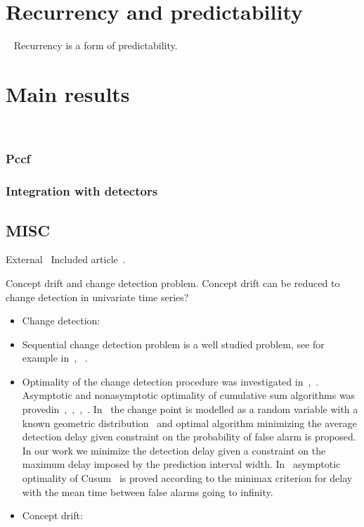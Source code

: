 \documentclass[licentiate,utf8,lot,loar,lof,shortloft,index]{jydiss}
\begin{document}
\chapter{Recurrency and predictability}
~\cite{feller2008introduction}
Recurrency is a form of predictability.


\chapter{Main results}
~\cite{MaslovSDM2016, MaslovIJCNN2017}
\subsection{Pccf}
\subsection{Integration with detectors}

\section{MISC}

External~\cite{shewhart1931economic}
Included article~\cite{sha1}.

Concept drift and change detection problem.
Concept drift can be reduced to change detection in univariate time series?


\begin{itemize}
  \item Change detection:~\cite{basseville1993detection}

  \item Sequential change detection problem is a well studied problem, see for example in~\cite{tartakovsky2014sequential}, ~\cite{plasse2021streaming}. 

  \item Optimality of the change detection procedure was investigated in~\cite{Page1954},~\cite{Shiryaev2010,Shiryaev1961,Shiryaev1963}.
  Asymptotic and nonasymptotic optimality of cumulative sum algorithms was provedin~\cite{lorden1971procedures},~\cite{moustakides1986optimal},~\cite{moustakides2004optimality},~\cite{ritov1990decision}. In~\cite{Shiryaev1963,shiryaev2007optimal} the change point is modelled as a random variable with a known geometric distribution~\cite{veeravalli2014quickest} and optimal algorithm minimizing the average detection delay given constraint on the probability of false alarm is proposed. In our work we minimize the detection delay given a constraint on the maximum delay imposed by the prediction interval width. In~\cite{lorden1971procedures} asymptotic optimality of Cusum~\cite{Page1954} is proved according to the minimax criterion for delay with the mean time between false alarms going to infinity.

  \item Concept drift:
\end{itemize}
\end{document}
